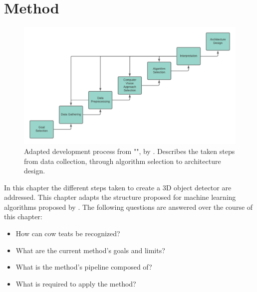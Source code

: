\chapter{Method}\label{chap:design}
\begin{figure}[!ht]
        \centering
        \includegraphics[width=1\textwidth]{images/adapted_development_process.png}
        \caption{Adapted development process from "", by \textcite{luckert2016using}. Describes the taken steps from data collection, through algorithm selection to architecture design.}
        \label{fig:development_design}
\end{figure}
In this chapter the different steps taken to create a 3D object detector are addressed. 
This chapter adapts the structure proposed for machine learning algorithms proposed by \textcite{luckert2016using}.
The following questions are answered over the course of this chapter:
\begin{itemize}
    \item How can cow teats be recognized?
    \item What are the current method's goals and limits?
    \item What is the method's pipeline composed of?
    \item What is required to apply the method?
\end{itemize}


